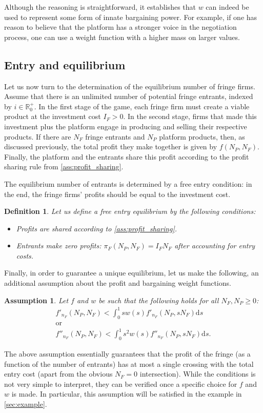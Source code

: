 \documentclass[a4paper]{article}
\newtheorem{definition}{Definition}
\newtheorem{assumption}{Assumption}
\newcommand{\ds}{\mathrm{d}s}
\begin{document}
Although the reasoning is straightforward, it establishes that $w$ can indeed be used to represent some form of innate bargaining power.
For example, if one has reason to believe that the platform has a stronger voice in the negotiation process, one can use a weight function with a higher mass on larger values.


\subsection{Entry and equilibrium}

Let us now turn to the determination of the equilibrium number of fringe firms.
Assume that there is an unlimited number of potential fringe entrants, indexed by $i \in \mathbb{R}^+_0$.
In the first stage of the game, each fringe firm must create a viable product at the investment cost $I_F > 0$.
In the second stage, firms that made this investment plus the platform engage in producing and selling their respective products.
If there are $N_F$ fringe entrants and $N_P$ platform products, then, as discussed previously, the total profit they make together is given by $f(N_P, N_F)$.
Finally, the platform and the entrants share this profit according to the profit sharing rule from \cref{ass:profit_sharing}.

The equilibrium number of entrants is determined by a free entry condition: in the end, the fringe firms' profits should be equal to the investment cost.
\begin{definition}
    \label{ass:free_entry}
    Let us define a free entry equilibrium by the following conditions:
    \begin{itemize}
        \item Profits are shared according to \cref{ass:profit_sharing}.
        \item Entrants make zero profits: $\pi_F(N_P, N_F) = I_F N_F$ after accounting for entry costs.
    \end{itemize}
\end{definition}

Finally, in order to guarantee a unique equilibrium, let us make the following, an additional assumption about the profit and bargaining weight functions.
\begin{assumption}
    \label{ass:single_crossing}
    Let $f$ and $w$ be such that the following holds for all $N_F, N_P \geq 0$:
    \begin{gather*}
        f'_{n_F} (N_P, N_F) < \int_0^1 s w(s) f'_{n_F} (N_P, s N_F) \ds \\
        \text{or} \\
        f''_{n_F} (N_P, N_F) < \int_0^1 s^2 w(s) f''_{n_F} (N_P, s N_F) \ds.
    \end{gather*}
\end{assumption}
The above assumption essentially guarantees that the profit of the fringe (as a function of the number of entrants) has at most a single crossing with the total entry cost (apart from the obvious $N_F=0$ intersection).
While the conditions is not very simple to interpret, they can be verified once a specific choice for $f$ and $w$ is made.
In particular, this assumption will be satisfied in the example in \cref{sec:example}.
\end{document}
